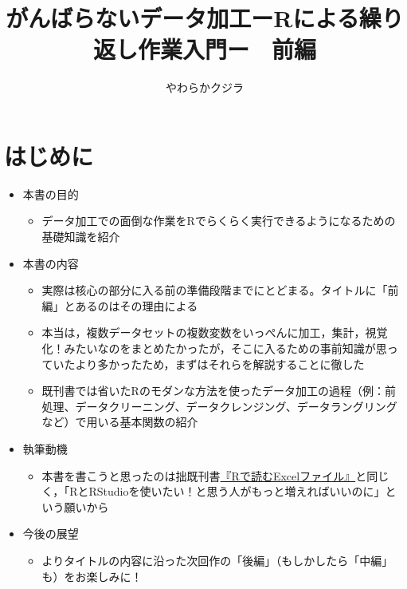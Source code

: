 \documentclass[
  xelatex,ja=standard, b5paper]{bxjsbook}
\title{がんばらないデータ加工ーRによる繰り返し作業入門ー　前編}
\author{やわらかクジラ}
\date{}
\providecommand{\tightlist}{%
  \setlength{\itemsep}{0pt}\setlength{\parskip}{0pt}}
\begin{document}
\maketitle

{
\setcounter{tocdepth}{1}
\tableofcontents
}
\hypertarget{hajimeni}{%
\chapter*{はじめに}\label{hajimeni}}

\begin{itemize}
\tightlist
\item
  本書の目的

  \begin{itemize}
  \tightlist
  \item
    データ加工での面倒な作業をRでらくらく実行できるようになるための基礎知識を紹介
  \end{itemize}
\item
  本書の内容

  \begin{itemize}
  \tightlist
  \item
    実際は核心の部分に入る前の準備段階までにとどまる。タイトルに「前編」とあるのはその理由による
  \item
    本当は，複数データセットの複数変数をいっぺんに加工，集計，視覚化！みたいなのをまとめたかったが，そこに入るための事前知識が思っていたより多かったため，まずはそれらを解説することに徹した
  \item
    既刊書では省いたRのモダンな方法を使ったデータ加工の過程（例：前処理、データクリーニング、データクレンジング、データラングリングなど）で用いる基本関数の紹介
  \end{itemize}
\item
  執筆動機

  \begin{itemize}
  \tightlist
  \item
    本書を書こうと思ったのは拙既刊書\href{https://techbookfest.org/product/4794168259903488?productVariantID=5913872206659584}{『Rで読むExcelファイル』}と同じく，「RとRStudioを使いたい！と思う人がもっと増えればいいのに」という願いから
  \end{itemize}
\item
  今後の展望

  \begin{itemize}
  \tightlist
  \item
    よりタイトルの内容に沿った次回作の「後編」（もしかしたら「中編」も）をお楽しみに！
  \end{itemize}
\end{itemize}
\end{document}
